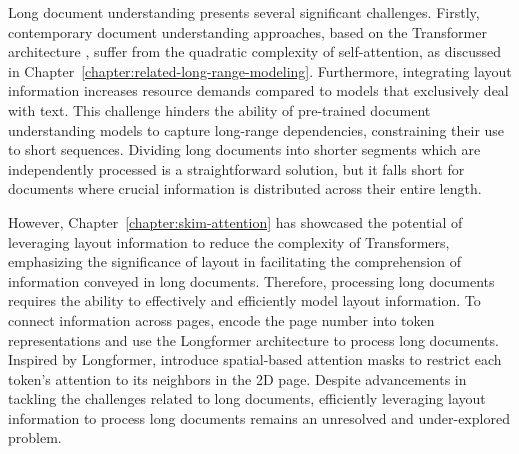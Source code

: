 

\newpage

\minitoc
{}

Long document understanding presents several significant challenges. Firstly, contemporary document understanding approaches, based on the Transformer architecture \citep{vaswani2017attention}, suffer from the quadratic complexity of self-attention, as discussed in Chapter~\ref{chapter:related-long-range-modeling}. Furthermore, integrating layout information increases resource demands compared to models that exclusively deal with text. This challenge hinders the ability of pre-trained document understanding models to capture long-range dependencies, constraining their use to short sequences. Dividing long documents into shorter segments which are independently processed is a straightforward solution, but it falls short for documents where crucial information is distributed across their entire length.

However, Chapter~\ref{chapter:skim-attention} has showcased the potential of leveraging layout information to reduce the complexity of Transformers, emphasizing the significance of layout in facilitating the comprehension of information conveyed in long documents. Therefore, processing long documents requires the ability to effectively and efficiently model layout information. To connect information across pages, \citet{pramanik2020towards} encode the page number into token representations and use the Longformer architecture \citep{beltagy2020longformer} to process long documents. Inspired by Longformer, \citet{pham2022understanding} introduce spatial-based attention masks to restrict each token's attention to its neighbors in the 2D page. Despite advancements in tackling the challenges related to long documents, efficiently leveraging layout information to process long documents remains an unresolved and under-explored problem.

